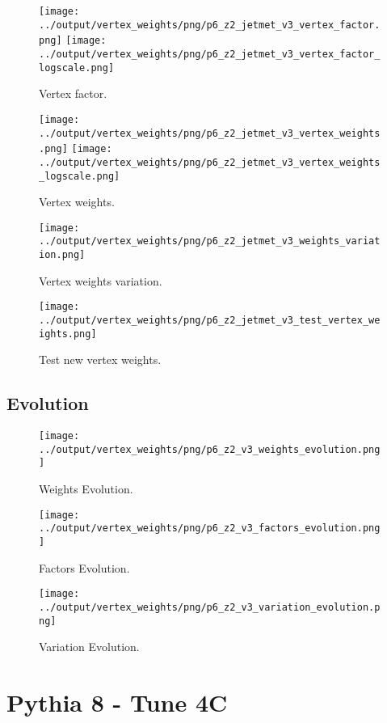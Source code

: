 \documentclass[11pt]{book}
\begin{document}
\begin{figure}[ht]
\centering
\texttt{[image: ../output/vertex\_weights/png/p6\_z2\_jetmet\_v3\_vertex\_factor.png]}
\texttt{[image: ../output/vertex\_weights/png/p6\_z2\_jetmet\_v3\_vertex\_factor\_logscale.png]}
\caption{Vertex factor.}
\end{figure}

\begin{figure}[ht]
\centering
\texttt{[image: ../output/vertex\_weights/png/p6\_z2\_jetmet\_v3\_vertex\_weights.png]}
\texttt{[image: ../output/vertex\_weights/png/p6\_z2\_jetmet\_v3\_vertex\_weights\_logscale.png]}
\caption{Vertex weights.}
\end{figure}

\begin{figure}[ht]
\centering
\texttt{[image: ../output/vertex\_weights/png/p6\_z2\_jetmet\_v3\_weights\_variation.png]}
\caption{Vertex weights variation.}
\end{figure}

\begin{figure}[ht]
\centering
\texttt{[image: ../output/vertex\_weights/png/p6\_z2\_jetmet\_v3\_test\_vertex\_weights.png]}
\caption{Test new vertex weights.}
\end{figure}
\clearpage

\subsection{Evolution}
\begin{figure}[ht]
\centering
\texttt{[image: ../output/vertex\_weights/png/p6\_z2\_v3\_weights\_evolution.png]}
\caption{Weights Evolution.}
\end{figure}


\begin{figure}[ht]
\centering
\texttt{[image: ../output/vertex\_weights/png/p6\_z2\_v3\_factors\_evolution.png]}
\caption{Factors Evolution.}
\end{figure}

\begin{figure}[ht]
\centering
\texttt{[image: ../output/vertex\_weights/png/p6\_z2\_v3\_variation\_evolution.png]}
\caption{Variation Evolution.}
\end{figure}
\clearpage

\section{Pythia 8 - Tune 4C}
\end{document}
